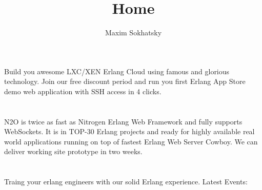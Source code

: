 \documentclass[11pt]{article}
\begin{document}
\title{Home}
\author{Maxim Sokhatsky}

\section*{}
\paragraph{}
Build you awesome LXC/XEN Erlang Cloud using famous  and glorious  technology.
Join our free discount period and run you first Erlang App Store demo web application with SSH access in 4 clicks.

\section*{}
\paragraph{}
N2O is twice as fast as Nitrogen Erlang Web Framework and fully supports WebSockets.
It is in TOP-30 Erlang projects and ready for highly available real world applications running on top of fastest Erlang Web Server Cowboy.
We can deliver working site prototype in two weeks.

\section*{}
\paragraph{}
Traing your erlang engineers with our solid Erlang experience.
Latest Events:
\paragraph{}
\end{document}
